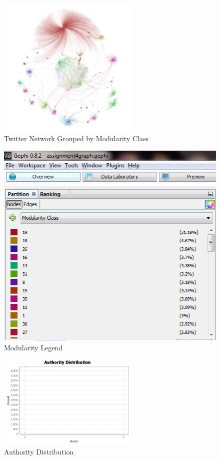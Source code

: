 \documentclass[letterpaper,11pt]{report}
\begin{document}
\begin{savenotes}
\begin{figure}[htbp]
	\centering
		\includegraphics[width=0.60\textwidth]{ModularityClassGraph.png}
	\caption{Twitter Network Grouped by Modularity Class}
	\label{fig:ModularityClassGraph}
\end{figure}

\begin{figure}[htbp]
	\centering
		\includegraphics{ModularityLegend.png}
	\caption{Modularity Legend}
	\label{fig:ModularityLegend}
\end{figure}

\begin{figure}[htbp]
	\centering
		\includegraphics[width=0.60\textwidth]{authorities.png}
	\caption{Authority Distribution}
	\label{fig:authorities}
\end{figure}


\end{savenotes}
\end{document}
